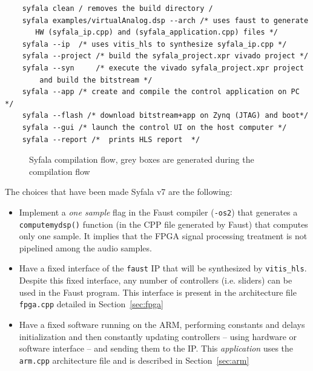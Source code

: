\documentclass[11pt]{article}
\numberwithin{equation}{section}
\numberwithin{figure}{section}
\begin{document}
  \begin{boxedminipage}{\textwidth}
  \begin{verbatim}
    syfala clean / removes the build directory /
    syfala examples/virtualAnalog.dsp --arch /* uses faust to generate
       HW (syfala_ip.cpp) and (syfala_application.cpp) files */
    syfala --ip  /* uses vitis_hls to synthesize syfala_ip.cpp */
    syfala --project /* build the syfala_project.xpr vivado project */
    syfala --syn     /* execute the vivado syfala_project.xpr project
        and build the bitstream */
    syfala --app /* create and compile the control application on PC */
    syfala --flash /* download bitstream+app on Zynq (JTAG) and boot*/
    syfala --gui /* launch the control UI on the host computer */
    syfala --report /*  prints HLS report  */
\end{verbatim}
\end{boxedminipage}
  
\begin{figure}[h]
  \begin{center}
    
    \end{center}
  \caption{Syfala compilation flow, grey boxes are generated during the compilation flow}
  \label{fig1}
\end{figure}

The choices that have been made Syfala v7 are the following:
\begin{itemize}
\item Implement a {\em one sample} flag in the Faust compiler ({\tt -os2}) that generates a {\tt computemydsp()} function (in the  CPP file generated by Faust) that computes only one sample. It implies that the FPGA signal processing treatment is not pipelined among the audio samples.
\item Have a fixed interface of the {\tt faust} IP that will be synthesized by {\tt vitis\_hls}. Despite this fixed interface, any  number of controllers (i.e. sliders) can be used in the Faust  program.    This interface is present in the architecture file {\tt fpga.cpp} detailed in Section~\ref{sec:fpga}
\item Have a fixed software running on the ARM, performing constants and delays initialization and then constantly updating controllers -- using hardware or software interface -- and sending them to the IP. This {\em application} uses the {\tt arm.cpp} architecture file and  is described in Section~\ref{sec:arm}    
\end{itemize}
  
\end{document}
